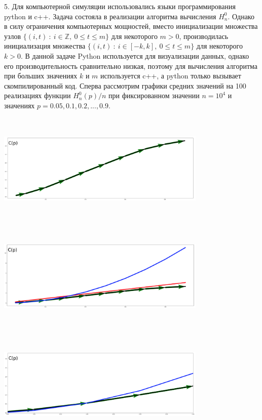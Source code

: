 \documentclass[10pt, reqno]{amsart}
\begin{document}
  5. Для компьютерной симуляции использовались языки программирования python и c++. Задача состояла в реализации алгоритма вычисления $H_{n}^{0}$. Однако в силу ограничения компьютерных мощностей, вместо инициализации множества узлов $\{(i, t) \: : \: i \in \mathbb{Z}, \: 0 \leq t \leq m\}$ для некоторого $m > 0$, производилась инициализация множества $\{(i, t) \: : \: i \in [-k, k], \: 0 \leq t \leq m\}$ для некоторого $k > 0$. В данной задаче Python используется для визуализации данных, однако его производительность сравнительно низкая, поэтому для вычисления алгоритма при больших значениях $k$ и $m$ используется c++, а python только вызывает скомпилированный код. Сперва рассмотрим графики средних значений на 100 реализациях функции $H_{n}^{0}(p)/n$ при фиксированном значении $n=10^{4}$ и значениях $p=0.05, 0.1, 0.2,..., 0.9$.\\\\
  \includegraphics[width=10cm, height=5cm]{c(p).png}
  \\\\
  \includegraphics[width=10cm, height=5cm]{c(p)_lin_sq.png}
  \\\\
  \includegraphics[width=10cm, height=5cm]{c(p)_sq_zoom.png}
\end{document}
